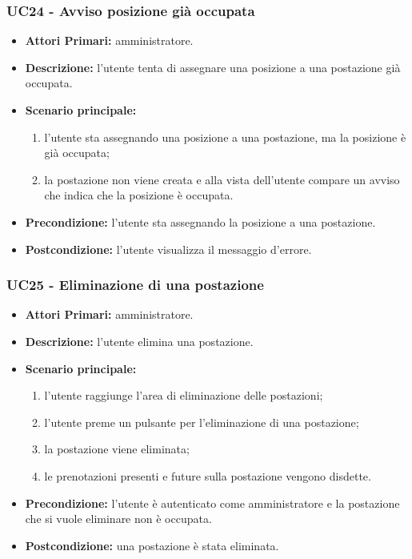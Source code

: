 \subsubsection{UC24 - Avviso posizione già occupata}
\begin{itemize}
	\item\textbf{Attori Primari:}
	amministratore.
	\item\textbf{Descrizione:}
	l'utente tenta di assegnare una posizione a una postazione già occupata.
	\item\textbf{Scenario principale:}
	\begin{enumerate}
		\item l'utente sta assegnando una posizione a una postazione, ma la posizione è già occupata;
		\item la postazione non viene creata e alla vista dell'utente compare un avviso che indica che la posizione è occupata.
	\end{enumerate}
	\item\textbf{Precondizione:}
	l'utente sta assegnando la posizione a una postazione.
	\item\textbf{Postcondizione:}
	l'utente visualizza il messaggio d'errore.
\end{itemize}

\subsubsection{UC25 - Eliminazione di una postazione}
\begin{itemize}
	\item\textbf{Attori Primari:}
	amministratore.
	\item\textbf{Descrizione:}
	l'utente elimina una postazione.
	\item\textbf{Scenario principale:} 
	\begin{enumerate}
		\item l'utente raggiunge l'area di eliminazione delle postazioni;
		\item l'utente preme un pulsante per l'eliminazione di una postazione;
		\item la postazione viene eliminata;
		\item le prenotazioni presenti e future sulla postazione vengono disdette.
	\end{enumerate}
	\item\textbf{Precondizione:} 
	l'utente è autenticato come amministratore e la postazione che si vuole eliminare non è occupata.
	\item\textbf{Postcondizione:}
	una postazione è stata eliminata.
\end{itemize}

